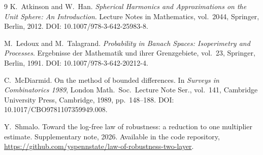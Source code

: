 \documentclass[11pt,reqno]{amsart}
\theoremstyle{plain}
\theoremstyle{definition}
\theoremstyle{remark}
\begin{document}
\begin{thebibliography}{9}
K.~Atkinson and W.~Han.
\newblock \emph{Spherical Harmonics and Approximations on the Unit Sphere: An Introduction}.
\newblock Lecture Notes in Mathematics, vol.~2044, Springer, Berlin, 2012. DOI: 10.1007/978-3-642-25983-8.

M.~Ledoux and M.~Talagrand.
\newblock \emph{Probability in Banach Spaces: Isoperimetry and Processes}.
\newblock Ergebnisse der Mathematik und ihrer Grenzgebiete, vol.~23, Springer, Berlin, 1991. DOI: 10.1007/978-3-642-20212-4.

C.~McDiarmid.
\newblock On the method of bounded differences.
\newblock In \emph{Surveys in Combinatorics 1989}, London Math.\ Soc.\ Lecture Note Ser., vol.~141, Cambridge University Press, Cambridge, 1989, pp.~148--188. DOI: 10.1017/CBO9781107359949.008.

Y.~Shmalo.
\newblock Toward the log-free law of robustness: a reduction to one multiplier estimate.
\newblock Supplementary note, 2026. Available in the code repository, \url{https://github.com/yspennstate/law-of-robustness-two-layer}.
\end{thebibliography}
\end{document}
